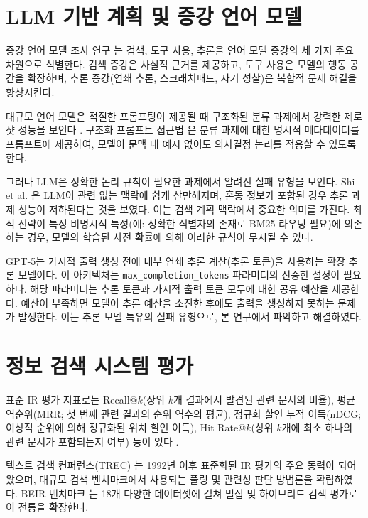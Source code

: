 \section{LLM 기반 계획 및 증강 언어 모델}
\label{sec:lit_llm_planning_ko}

증강 언어 모델 조사 연구 \citep{mialon2023augmented}는 검색, 도구 사용, 추론을 언어 모델 증강의 세 가지 주요 차원으로 식별한다. 검색 증강은 사실적 근거를 제공하고, 도구 사용은 모델의 행동 공간을 확장하며, 추론 증강(연쇄 추론, 스크래치패드, 자기 성찰)은 복합적 문제 해결을 향상시킨다.

대규모 언어 모델은 적절한 프롬프팅이 제공될 때 구조화된 분류 과제에서 강력한 제로샷 성능을 보인다 \citep{wei2022chain}. 구조화 프롬프트 접근법 \citep{mialon2023augmented}은 분류 과제에 대한 명시적 메타데이터를 프롬프트에 제공하여, 모델이 문맥 내 예시 없이도 의사결정 논리를 적용할 수 있도록 한다.

그러나 LLM은 정확한 논리 규칙이 필요한 과제에서 알려진 실패 유형을 보인다. Shi et al. \citep{shi2023large}은 LLM이 관련 없는 맥락에 쉽게 산만해지며, 혼동 정보가 포함된 경우 추론 과제 성능이 저하된다는 것을 보였다. 이는 검색 계획 맥락에서 중요한 의미를 가진다. 최적 전략이 특정 비명시적 특성(예: 정확한 식별자의 존재로 BM25 라우팅 필요)에 의존하는 경우, 모델의 학습된 사전 확률에 의해 이러한 규칙이 무시될 수 있다.

GPT-5는 가시적 출력 생성 전에 내부 연쇄 추론 계산(추론 토큰)을 사용하는 확장 추론 모델이다. 이 아키텍처는 \texttt{max\_completion\_tokens} 파라미터의 신중한 설정이 필요하다. 해당 파라미터는 추론 토큰과 가시적 출력 토큰 모두에 대한 공유 예산을 제공한다. 예산이 부족하면 모델이 추론 예산을 소진한 후에도 출력을 생성하지 못하는 문제가 발생한다. 이는 추론 모델 특유의 실패 유형으로, 본 연구에서 파악하고 해결하였다.

\section{정보 검색 시스템 평가}
\label{sec:lit_eval_ko}

표준 IR 평가 지표로는 Recall@$k$(상위 $k$개 결과에서 발견된 관련 문서의 비율), 평균 역순위(MRR; 첫 번째 관련 결과의 순위 역수의 평균), 정규화 할인 누적 이득(nDCG; 이상적 순위에 의해 정규화된 위치 할인 이득), Hit Rate@$k$(상위 $k$개에 최소 하나의 관련 문서가 포함되는지 여부) 등이 있다 \citep{manning2008ir, jaervelin2002ndcg}.

텍스트 검색 컨퍼런스(TREC) \citep{voorhees2005trec}는 1992년 이후 표준화된 IR 평가의 주요 동력이 되어 왔으며, 대규모 검색 벤치마크에서 사용되는 풀링 및 관련성 판단 방법론을 확립하였다. BEIR 벤치마크 \citep{thakur2021beir}는 18개 다양한 데이터셋에 걸쳐 밀집 및 하이브리드 검색 평가로 이 전통을 확장한다.

